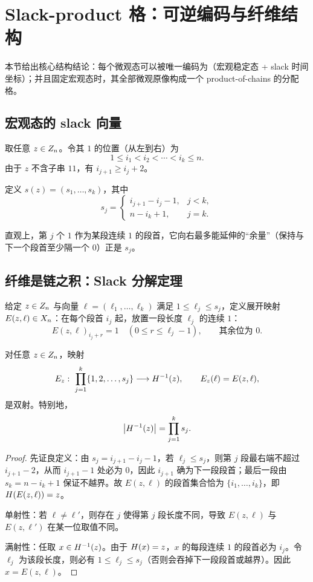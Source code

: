 
\section{Slack-product 格：可逆编码与纤维结构}

本节给出核心结构结论：每个微观态可以被唯一编码为（宏观稳定态 + slack 时间坐标）；并且固定宏观态时，其全部微观原像构成一个 product-of-chains 的分配格。

\subsection{宏观态的 slack 向量}

取任意 $z\in Z_n$。令其 $1$ 的位置（从左到右）为
$$
1\le i_1<i_2<\cdots<i_k\le n.
$$
由于 $z$ 不含子串 $11$，有 $i_{j+1}\ge i_j+2$。

\begin{definition}[slack 向量]\label{def:slack_vector}
定义 $s(z)=(s_1,\ldots,s_k)$，其中
$$
s_j=
\begin{cases}
i_{j+1}-i_j-1, & j<k,\\
n-i_k+1, & j=k.
\end{cases}
$$
\end{definition}

直观上，第 $j$ 个 $1$ 作为某段连续 $1$ 的段首，它向右最多能延伸的“余量”（保持与下一个段首至少隔一个 $0$）正是 $s_j$。

\subsection{纤维是链之积：Slack 分解定理}

给定 $z\in Z_n$ 与向量 $\ell=(\ell_1,\ldots,\ell_k)$ 满足 $1\le \ell_j\le s_j$，定义展开映射 $E(z,\ell)\in X_n$：在每个段首 $i_j$ 起，放置一段长度 $\ell_j$ 的连续 $1$：
$$
E(z,\ell)_{i_j+r}=1\quad (0\le r\le \ell_j-1),\qquad \text{其余位为 }0.
$$

\begin{theorem}\label{thm:slack_decomposition}
对任意 $z\in Z_n$，映射
$$
E_z:\ \prod_{j=1}^k\{1,2,\ldots,s_j\}\longrightarrow \Head^{-1}(z),\qquad
E_z(\ell)=E(z,\ell),
$$
是双射。特别地，
$$
\left\lvert H^{-1}(z)\right\rvert=\prod_{j=1}^k s_j.
$$
\end{theorem}

\begin{proof}
先证良定义：由 $s_j=i_{j+1}-i_j-1$，若 $\ell_j\le s_j$，则第 $j$ 段最右端不超过 $i_{j+1}-2$，从而 $i_{j+1}-1$ 处必为 $0$，因此 $i_{j+1}$ 确为下一段段首；最后一段由 $s_k=n-i_k+1$ 保证不越界。故 $E(z,\ell)$ 的段首集合恰为 $\{i_1,\ldots,i_k\}$，即 $H(E(z,\ell))=z$。

单射性：若 $\ell\neq \ell'$，则存在 $j$ 使得第 $j$ 段长度不同，导致 $E(z,\ell)$ 与 $E(z,\ell')$ 在某一位取值不同。

满射性：任取 $x\in H^{-1}(z)$。由于 $H(x)=z$，$x$ 的每段连续 $1$ 的段首必为 $i_j$。令 $\ell_j$ 为该段长度，则必有 $1\le \ell_j\le s_j$（否则会吞掉下一段段首或越界）。因此 $x=E(z,\ell)$。
\end{proof}

